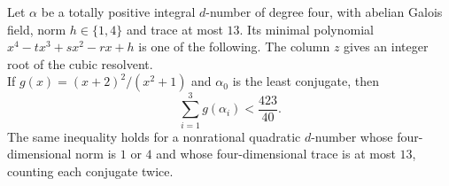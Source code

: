 \begin{lemma}\label{lem:abelian-low-trace}
Let $\alpha$ be a totally positive integral $d$-number of degree four,
with abelian Galois field, norm $h\in\{1,4\}$ and trace at most $13$.
Its minimal polynomial $x^4-tx^3+sx^2-rx+h$ is one of the following.
The column $z$ gives an integer root of the cubic resolvent.
\[

\]
If $g(x)=(x+2)^2/(x^2+1)$ and $\alpha_0$ is the least conjugate,
then
\begin{equation}\label{eq:low-trace-scalar}
 \sum_{i=1}^3g(\alpha_i)<\frac{423}{40}.
\end{equation}
The same inequality holds for a nonrational quadratic $d$-number whose
four-dimensional norm is $1$ or $4$ and whose four-dimensional trace is
at most $13$, counting each conjugate twice.
\end{lemma}
